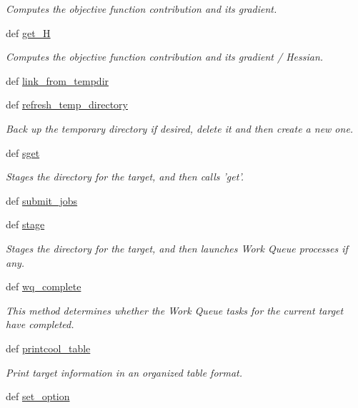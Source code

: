 \begin{DoxyCompactItemize}
\begin{DoxyCompactList}\small\item\em \-Computes the objective function contribution and its gradient. \end{DoxyCompactList}\item 
def \hyperlink{classforcebalance_1_1target_1_1Target_a1d2ee27fe86a09769c1816af23b09adb}{get\-\_\-\-H}
\begin{DoxyCompactList}\small\item\em \-Computes the objective function contribution and its gradient / \-Hessian. \end{DoxyCompactList}\item 
def \hyperlink{classforcebalance_1_1target_1_1Target_a5aa4958cea0a48138511567a076c5a82}{link\-\_\-from\-\_\-tempdir}
\item 
def \hyperlink{classforcebalance_1_1target_1_1Target_afe815eafab06ac92f10bbf4b88ad95c8}{refresh\-\_\-temp\-\_\-directory}
\begin{DoxyCompactList}\small\item\em \-Back up the temporary directory if desired, delete it and then create a new one. \end{DoxyCompactList}\item 
def \hyperlink{classforcebalance_1_1target_1_1Target_a51d58b55242bf4d4909c1837174f5f3c}{sget}
\begin{DoxyCompactList}\small\item\em \-Stages the directory for the target, and then calls 'get'. \end{DoxyCompactList}\item 
def \hyperlink{classforcebalance_1_1target_1_1Target_a78cd29b94cbcc201eed99c78aaef46a4}{submit\-\_\-jobs}
\item 
def \hyperlink{classforcebalance_1_1target_1_1Target_af8d2a4658c87841e40296795aec478bb}{stage}
\begin{DoxyCompactList}\small\item\em \-Stages the directory for the target, and then launches \-Work \-Queue processes if any. \end{DoxyCompactList}\item 
def \hyperlink{classforcebalance_1_1target_1_1Target_af6099ec09486213869dba2491bd8ea04}{wq\-\_\-complete}
\begin{DoxyCompactList}\small\item\em \-This method determines whether the \-Work \-Queue tasks for the current target have completed. \end{DoxyCompactList}\item 
def \hyperlink{classforcebalance_1_1target_1_1Target_ac30a4e9d7d9fe06f7caefa5f7cfab09b}{printcool\-\_\-table}
\begin{DoxyCompactList}\small\item\em \-Print target information in an organized table format. \end{DoxyCompactList}\item 
def \hyperlink{classforcebalance_1_1BaseClass_a73e9a37a7632e79eb99f49bd15aced45}{set\-\_\-option}
\end{DoxyCompactItemize}
